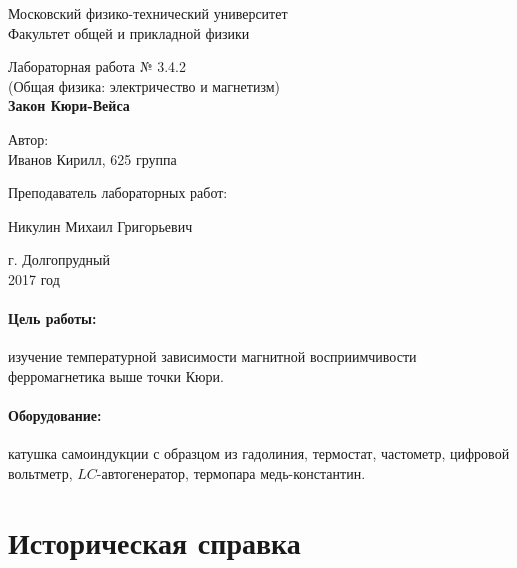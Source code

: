 \documentclass[12pt]{kiarticle}
\begin{document}
\begin{titlepage}
	\begin{center}
		\large 	Московский физико-технический университет \\
		Факультет общей и прикладной физики \\
		\vspace{0.2cm}
		
		\vspace{4.5cm}
		Лабораторная работа № 3.4.2 \\ \vspace{0.2cm}
		\large (Общая физика: электричество и магнетизм) \\ \vspace{0.2cm}
		\LARGE \textbf{Закон Кюри-Вейса}
	\end{center}
	\vspace{2.3cm} \large
	
	\begin{center}
		Автор: \\
		Иванов Кирилл,
		625 группа
		\vspace{10mm}
		
		Преподаватель лабораторных работ: 
		
		Никулин Михаил Григорьевич
		
		
	\end{center}
	
	\begin{center} \vspace{50mm}
		г. Долгопрудный \\
		 2017 год
	\end{center}
\end{titlepage}

\paragraph*{Цель работы:} изучение температурной зависимости магнитной восприимчивости ферромагнетика выше точки Кюри.

\paragraph*{Оборудование:} катушка самоиндукции с образцом из гадолиния, термостат, частометр, цифровой вольтметр, $ LC $-автогенератор, термопара медь-константин.


\section{Историческая справка}
\end{document}
